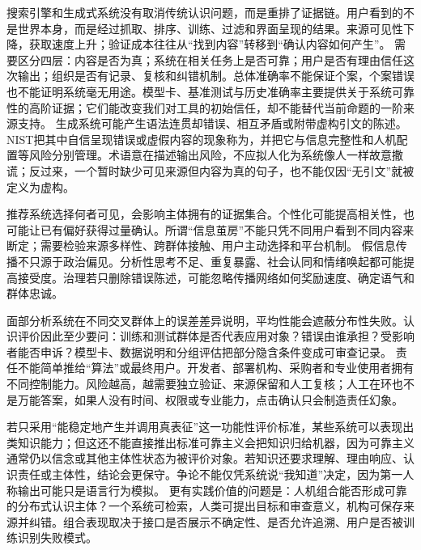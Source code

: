 搜索引擎和生成式系统没有取消传统认识问题，而是重排了证据链。用户看到的不是世界本身，而是经过抓取、排序、训练、过滤和界面呈现的结果。来源可见性下降，获取速度上升；验证成本往往从“找到内容”转移到“确认内容如何产生”。 需要区分四层：内容是否为真；系统在相关任务上是否可靠；用户是否有理由信任这次输出；组织是否有记录、复核和纠错机制。总体准确率不能保证个案，个案错误也不能证明系统毫无用途。模型卡、基准测试与历史准确率主要提供关于系统可靠性的高阶证据；它们能改变我们对工具的初始信任，却不能替代当前命题的一阶来源支持。 生成系统可能产生语法连贯却错误、相互矛盾或附带虚构引文的陈述\parencite{bender2021}。NIST把其中自信呈现错误或虚假内容的现象称为，并把它与信息完整性和人机配置等风险分别管理\parencite{nist2024}。术语意在描述输出风险，不应拟人化为系统像人一样故意撒谎；反过来，一个暂时缺少可见来源但内容为真的句子，也不能仅因“无引文”就被定义为虚构。

推荐系统选择何者可见，会影响主体拥有的证据集合。个性化可能提高相关性，也可能让已有偏好获得过量确认。所谓“信息茧房”不能只凭不同用户看到不同内容来断定；需要检验来源多样性、跨群体接触、用户主动选择和平台机制。 假信息传播不只源于政治偏见。分析性思考不足、重复暴露、社会认同和情绪唤起都可能提高接受度\parencite{pennycook2019}。治理若只删除错误陈述，可能忽略传播网络如何奖励速度、确定语气和群体忠诚\parencite{oconnor2019}。

面部分析系统在不同交叉群体上的误差差异说明，平均性能会遮蔽分布性失败\parencite{buolamwini2018}。认识评价因此至少要问：训练和测试群体是否代表应用对象？错误由谁承担？受影响者能否申诉？模型卡、数据说明和分组评估把部分隐含条件变成可审查记录\parencite{mitchell2019}。 责任不能简单推给“算法”或最终用户。开发者、部署机构、采购者和专业使用者拥有不同控制能力。风险越高，越需要独立验证、来源保留和人工复核；人工在环也不是万能答案，如果人没有时间、权限或专业能力，点击确认只会制造责任幻象\parencite{floridi2019,raji2020}。

若只采用“能稳定地产生并调用真表征”这一功能性评价标准，某些系统可以表现出类知识能力；但这还不能直接推出标准可靠主义会把知识归给机器，因为可靠主义通常仍以信念或其他主体性状态为被评价对象。若知识还要求理解、理由响应、认识责任或主体性，结论会更保守。争论不能仅凭系统说“我知道”决定，因为第一人称输出可能只是语言行为模拟。 更有实践价值的问题是：人机组合能否形成可靠的分布式认识主体？一个系统可检索，人类可提出目标和审查意义，机构可保存来源并纠错。组合表现取决于接口是否展示不确定性、是否允许追溯、用户是否被训练识别失败模式。

